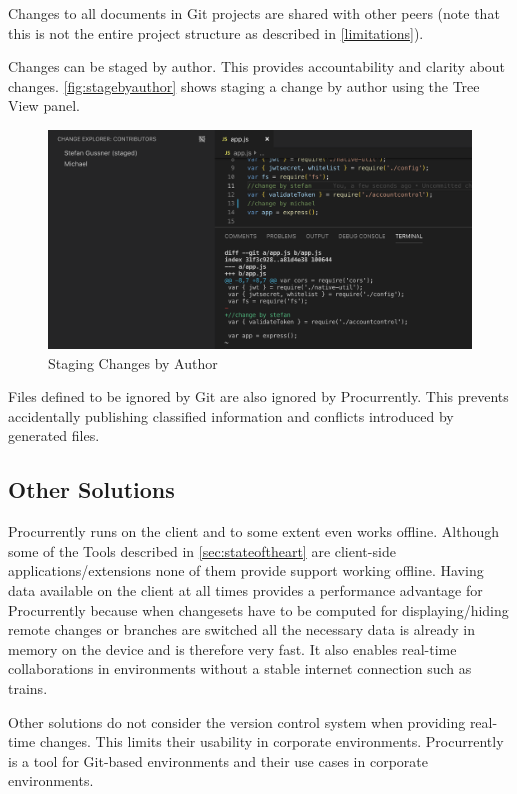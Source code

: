 Changes to all documents in Git projects are shared with other peers (note that this is not the entire project structure as described in \autoref{limitations}).

Changes can be staged by author. This provides accountability and clarity about changes. \autoref{fig:stagebyauthor} shows staging a change by author using the Tree View panel. 

\begin{figure}[hb]
    \centering
    \includegraphics[width=150mm]{figures/screenshots/stage-by-author.png}
	\caption{Staging Changes by Author}
    \label{fig:stagebyauthor}
\end{figure}

Files defined to be ignored by Git are also ignored by Procurrently. This prevents accidentally publishing classified information and conflicts introduced by generated files. 

\subsection{Other Solutions}
Procurrently runs on the client and to some extent even works offline. Although some of the Tools described in \autoref{sec:stateoftheart} are client-side applications/extensions none of them provide support working offline. Having data available on the client at all times provides a performance advantage for Procurrently because when changesets have to be computed for displaying/hiding remote changes or branches are switched all the necessary data is already in memory on the device and is therefore very fast. It also enables real-time collaborations in environments without a stable internet connection such as trains.

Other solutions do not consider the version control system when providing real-time changes. This limits their usability in corporate environments. Procurrently is a tool for Git-based environments and their use cases in corporate environments. 

